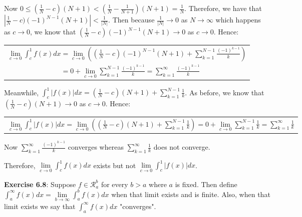 \documentclass{book}
\newenvironment{myIndent}{%
   \begin{adjustwidth}{2.5em}{0em}%
}{%
   \end{adjustwidth}%
}
\newcommand{\retTwo}{\hfill\bigbreak}
\begin{document}
\begin{itemize}
{\begin{myIndent}
      Now $ 0 \leq (\frac{1}{N} - c)(N + 1) < (\frac{1}{N} - \frac{1}{N+1})(N + 1) = \frac{1}{N}$. Therefore, we have that\\ $\left|\frac{1}{N} - c)(-1)^{N-1}(N+1)\right| < \frac{1}{|N|}$. Then because $\frac{1}{|N|} \rightarrow 0$ as $N \rightarrow \infty$ which happens\\ as $c \rightarrow 0$, we know that $(\frac{1}{N} - c)(-1)^{N-1}(N+1) \rightarrow 0$ as $c \rightarrow 0$. Hence:

      {\centering 
      \begin{tabular}{l}
         $\lim\limits_{c\rightarrow 0}\int_c^1f(x)dx = \lim\limits_{c\rightarrow 0}\left((\frac{1}{N} - c)(-1)^{N-1}(N+1) + \sum\limits_{k=1}^{N-1}\frac{(-1)^{k-1}}{k}\right)$\\
         
         $\phantom{\lim\limits_{c\rightarrow 0}\int_c^1f(x)dx} = 0 + \lim\limits_{c\rightarrow 0}\sum\limits_{k=1}^{N-1}\frac{(-1)^{k-1}}{k} = \sum\limits_{k=1}^\infty \frac{(-1)^{k-1}}{k}$ 
      \end{tabular}\retTwo\par}

      Meanwhile, $\int_c^1|f(x)|dx = (\frac{1}{N} - c)(N+1) + \sum\limits_{k=1}^{N-1}\frac{1}{k}$. As before, we know that\\ [-6pt] $(\frac{1}{N} - c)(N+1) \rightarrow 0$ as $c \rightarrow 0$. Hence:

      {\centering 
      \begin{tabular}{l}
         $\lim\limits_{c\rightarrow 0}\int_c^1|f(x)|dx = \lim\limits_{c\rightarrow 0}\left((\frac{1}{N} - c)(N+1) + \sum\limits_{k=1}^{N-1}\frac{1}{k}\right) = 0 + \lim\limits_{c\rightarrow 0}\sum\limits_{k=1}^{N-1}\frac{1}{k} = \sum\limits_{k=1}^\infty \frac{1}{k}$ 
      \end{tabular}\retTwo\par}

      Now $\sum\limits_{k=1}^\infty \frac{(-1)^{k-1}}{k}$ converges whereas $\sum\limits_{k=1}^\infty \frac{1}{k}$ does not converge.\retTwo

      Therefore, $\lim\limits_{c\rightarrow 0}\int_c^1 f(x)dx$ exists but not $\lim\limits_{c\rightarrow 0}\int_c^1 |f(x)|dx$.
   \end{myIndent}}
\end{itemize}

\newpage

\textbf{Exercise 6.8}: Suppose $f \in \mathscr{R}_a^b$ for every $b > a$ where $a$ is fixed. Then define\\ $\int_a^\infty f(x)dx = \lim\limits_{b \rightarrow \infty}\int_a^bf(x)dx$ when that limit exists and is finite. Also, when that\\ limit exists we say that $\int_a^\infty f(x)dx$ "converges".\retTwo
\end{document}
